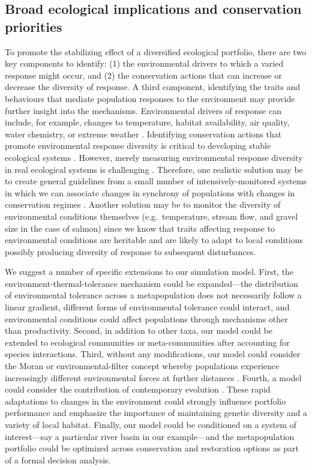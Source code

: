 \subsection{Broad ecological implications and conservation priorities}\label{broad-ecological-implications-and-conservation-priorities}

To promote the stabilizing effect of a diversified ecological portfolio, there are two key components to identify: (1) the environmental drivers to which a varied response might occur, and (2) the conservation actions that can increase or decrease the diversity of response. A third component, identifying the traits and behaviours that mediate population responses to the environment may provide further insight into the mechanisms. Environmental drivers of response can include, for example, changes to temperature, habitat availability, air quality, water chemistry, or extreme weather \citep{elmqvist2003}. Identifying conservation actions that promote environmental response diversity is critical to developing stable ecological systems \citep{mori2013}. However, merely measuring environmental response diversity in real ecological systems is challenging \citep[albeit possible;][]{thibaut2012}. Therefore, one realistic solution may be to create general guidelines from a small number of intensively-monitored systems in which we can associate changes in synchrony of populations with changes in conservation regimes \citep[e.g.][]{moore2010, carlson2011}. Another solution may be to monitor the diversity of environmental conditions themselves (e.g.~temperature, stream flow, and gravel size in the case of salmon) since we know that traits affecting response to environmental conditions are heritable and are likely to adapt to local conditions \citep{carlson2011} possibly producing diversity of response to subsequent disturbances.

We suggest a number of specific extensions to our simulation model. First, the environment-thermal-tolerance mechanism could be expanded---the distribution of environmental tolerance across a metapopulation does not necessarily follow a linear gradient, different forms of environmental tolerance could interact, and environmental conditions could affect populations through mechanisms other than productivity. Second, in addition to other taxa, our model could be extended to ecological communities or meta-communities after accounting for species interactions. Third, without any modifications, our model could consider the Moran or environmental-filter concept whereby populations experience increasingly different environmental forces at further distances \citep{schindler2008, rogers2008}. Fourth, a model could consider the contribution of contemporary evolution \citep{stockwell2003}. These rapid adaptations to changes in the environment could strongly influence portfolio performance and emphasize the importance of maintaining genetic diversity and a variety of local habitat. Finally, our model could be conditioned on a system of interest---say a particular river basin in our example---and the metapopulation portfolio could be optimized across conservation and restoration options as part of a formal decision analysis.

